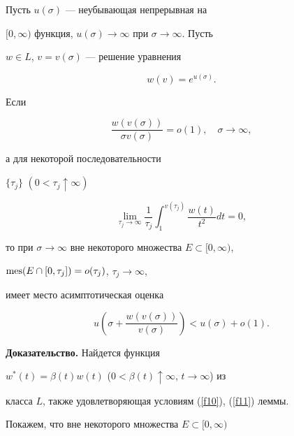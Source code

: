 \begin{lem}


Пусть $u(\sigma)$ --- неубывающая непрерывная на


$[0,\infty)$ функция, $u(\sigma)\to\infty$ при $\sigma\to\infty$. Пусть


$w\in L$, $v=v(\sigma)$ --- решение уравнения


\begin{equation}\label{f9}


w(v)=e^{u(\sigma)}.


\end{equation}


Если


\begin{equation}\label{f10}


\frac{w(v(\sigma))}{\sigma v(\sigma)}=o(1),\quad \sigma\to\infty,


\end{equation}


а для некоторой последовательности


$\{\tau_{j}\}$ $(0<\tau_{j}\uparrow\infty)$


\begin{equation}\label{f11}


\lim_{\tau_{j}\to\infty}\frac{1}{\tau_{j}}


\int_{1}^{v(\tau_{j})}\frac{w(t)}{t^{2}}dt=0,


\end{equation}


то при $\sigma\to\infty$ вне некоторого множества $E\subset[0,\infty)$,


$\operatorname{mes}(E\cap[0,\tau_{j}])=o(\tau_{j})$, $\tau_{j}\to\infty$,


имеет место асимптотическая оценка


$$


u(\sigma+ \frac{w(v(\sigma))}{v(\sigma)})<u(\sigma)+o(1).


$$


\end{lem}





{\bf Доказательство.} Найдется функция


$w^{*}(t)=\beta(t)w(t)$ ($0<\beta(t)\uparrow\infty$, $t \to\infty$) из


класса $L$, также удовлетворяющая условиям (\ref{f10}), (\ref{f11}) леммы.


Покажем, что вне некоторого множества $E\subset[0,\infty)$


